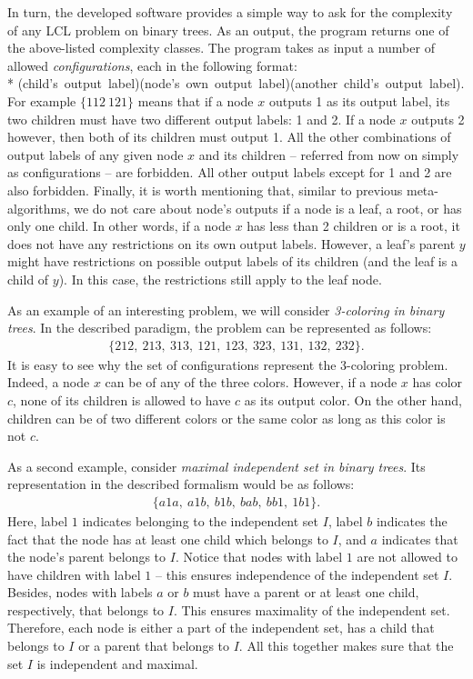 In turn, the developed software provides a simple way to ask for the complexity
of any LCL problem on binary trees. As an output, the program returns
one of the above-listed complexity classes. The program takes as input a
number of allowed \emph{configurations}, each in the following format:\\*
\mbox{(child's~output~label)(node's~own~output~label)(another~child's~output~label)}.
For example $\{112~121\}$ means that if a node $x$ outputs 1 as its output label,
its two children must have two different output labels: 1 and 2. If
a node $x$ outputs 2 however, then both of its children must output 1.
All the other combinations of output labels of any given node $x$ and
its children -- referred from now on simply as configurations --
are forbidden. All other output labels except for 1 and 2 are also
forbidden. Finally, it is worth mentioning that, similar to previous
meta-algorithms, we do not care about node's outputs if a node is a leaf,
a root, or has only one child. In other words, if a node $x$ has less than
2 children or is a root, it
does not have any restrictions on its own output labels. However, a leaf's parent $y$ might have restrictions on possible output labels of its children
(and the leaf is a child of $y$). In this case, the restrictions still
apply to the leaf node.

As an example of an interesting problem, we will consider
\emph{3-coloring in binary trees}. In the described paradigm,
the problem can be represented as follows:
\begin{align*}
  \{212,~213,~313,~121,~123,~323,~131,~132,~232\}.
\end{align*}
It is easy to see why the set of configurations represent the
3-coloring problem. Indeed, a node $x$ can be of any of the three
colors. However, if a node $x$ has color $c$, none of its
children is allowed to have $c$ as its output color. On the
other hand, children can be of two different colors or the same
color as long as this color is not $c$.

As a second example, consider \emph{maximal independent set in
binary trees}. Its representation in the described formalism would be
as follows:
\begin{align*}
  \{a1a,~a1b,~b1b,~bab,~bb1,~1b1\}.
\end{align*}
Here, label $1$ indicates belonging to the independent set $I$, label $b$
indicates the fact that the node has at least one child which belongs to
$I$, and $a$ indicates that the node's parent belongs to $I$.
Notice that nodes with label $1$ are not allowed to have children with
label $1$ -- this ensures independence of the independent set $I$.
Besides, nodes with labels $a$ or $b$ must have a parent or at least one
child, respectively, that belongs to $I$. This ensures maximality of the
independent set.
Therefore,
each node is either a part of the independent set, has a child that belongs
to $I$ or a parent that belongs to $I$. All this together makes sure
that the set $I$ is independent and maximal.

